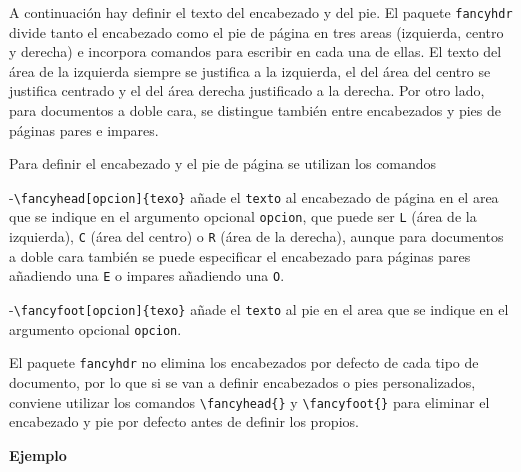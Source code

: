 \documentclass[
  letterpaper,
  DIV=11,
  numbers=noendperiod]{scrreport}
\begin{document}
A continuación hay definir el texto del encabezado y del pie. El paquete
\texttt{fancyhdr} divide tanto el encabezado como el pie de página en
tres areas (izquierda, centro y derecha) e incorpora comandos para
escribir en cada una de ellas. El texto del área de la izquierda siempre
se justifica a la izquierda, el del área del centro se justifica
centrado y el del área derecha justificado a la derecha. Por otro lado,
para documentos a doble cara, se distingue también entre encabezados y
pies de páginas pares e impares.

Para definir el encabezado y el pie de página se utilizan los comandos

-\texttt{\textbackslash{}fancyhead{[}opcion{]}\{texo\}} añade el
\texttt{texto} al encabezado de página en el area que se indique en el
argumento opcional \texttt{opcion}, que puede ser \texttt{L} (área de la
izquierda), \texttt{C} (área del centro) o \texttt{R} (área de la
derecha), aunque para documentos a doble cara también se puede
especificar el encabezado para páginas pares añadiendo una \texttt{E} o
impares añadiendo una \texttt{O}.

-\texttt{\textbackslash{}fancyfoot{[}opcion{]}\{texo\}} añade el
\texttt{texto} al pie en el area que se indique en el argumento opcional
\texttt{opcion}.

\begin{tcolorbox}[enhanced jigsaw, arc=.35mm, toprule=.15mm, opacitybacktitle=0.6, colback=white, coltitle=black, colbacktitle=quarto-callout-warning-color!10!white, breakable, colframe=quarto-callout-warning-color-frame, left=2mm, opacityback=0, bottomtitle=1mm, toptitle=1mm, titlerule=0mm, title=\textcolor{quarto-callout-warning-color}{\faExclamationTriangle}\hspace{0.5em}{Advertencia}, bottomrule=.15mm, leftrule=.75mm, rightrule=.15mm]
El paquete \texttt{fancyhdr} no elimina los encabezados por defecto de
cada tipo de documento, por lo que si se van a definir encabezados o
pies personalizados, conviene utilizar los comandos
\texttt{\textbackslash{}fancyhead\{\}} y
\texttt{\textbackslash{}fancyfoot\{\}} para eliminar el encabezado y pie
por defecto antes de definir los propios.
\end{tcolorbox}

\textbf{Ejemplo}
\end{document}
